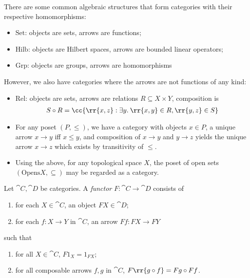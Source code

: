 \documentclass{article}
\begin{document}
\begin{example}
  There are some common algebraic structures that form categories with their respective
  homomorphisms:
  \begin{itemize}
    \item $\text{Set}$: objects are sets, arrows are functions;
    \item $\text{Hilb}$: objects are Hilbert spaces, arrows are bounded linear operators;
    \item $\text{Grp}$: objects are groups, arrows are homomorphisms
  \end{itemize}
\end{example}

\begin{example}
  However, we also have categories where the arrows are not functions of any kind:
  \begin{itemize}
    \item $\text{Rel}$: objects are sets, arrows are relations $R\subseteq X\times Y$,
      composition is
      \begin{align*}
        S\circ R=\cc{\rr{x,z} : \exists y.\:\rr{x,y}\in R,\rr{y,z}\in S}
      \end{align*}
    \item For any poset $(P,\leq)$, we have a category with objects $x\in P$,
      a unique arrow $x\to y$ iff $x\leq y$, and composition of $x\to y$ and
      $y\to z$ yields the unique arrow $x\to z$ which exists by transitivity
      of $\leq$.
    \item Using the above, for any topological space $X$, the poset of open sets
      $(\text{Opens}X, \subseteq)$ may be regarded as a category.
  \end{itemize}
\end{example}

\begin{definition}[Functor]\label{def:functor}
  Let $\cat{C},\cat{D}$ be categories. A \emph{functor} $F:\cat{C}\to\cat{D}$
  consists of
  \begin{enumerate}
    \item for each $X\in\cat{C}$, an object $FX\in\cat{D}$;
    \item for each $f:X\to Y$ in $\cat{C}$, an arrow $Ff:FX\to FY$
  \end{enumerate}
  such that
  \begin{enumerate}
    \item for all $X\in\cat{C}$, $F1_X=1_{FX}$;
    \item for all composable arrows $f,g$ in $\cat{C}$, $F\rr{g\circ f}=Fg\circ Ff$.
  \end{enumerate}
\end{definition}
\end{document}
